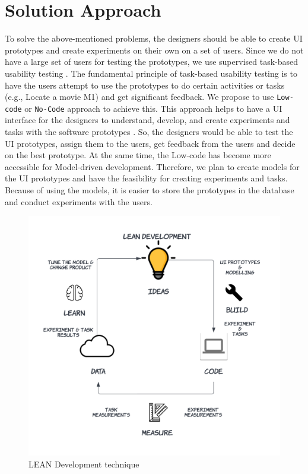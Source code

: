 \section{Solution Approach}
\label{intro:section:solution}
To solve the above-mentioned problems, the designers should be able to create UI prototypes and create experiments on their own on a set of users.
Since we do not have a large set of users for testing the prototypes, we use supervised task-based usability testing \cite{article:dataanalysis:supervisedtest}.
The fundamental principle of task-based usability testing is to have the users attempt to use the prototypes to do certain activities or tasks (e.g., Locate a movie M1) and get significant feedback.
We propose to use \texttt{Low-code} or \texttt{No-Code} approach to achieve this.
This approach helps to have a UI interface for the designers to understand, develop, and create experiments and tasks with the software prototypes \cite{paper:lowcode:khorram}.
So, the designers would be able to test the UI prototypes, assign them to the users, get feedback from the users and decide on the best prototype.
At the same time, the Low-code has become more accessible for Model-driven development.
Therefore, we plan to create models for the UI prototypes and have the feasibility for creating experiments and tasks. 
Because of using the models, it is easier to store the prototypes in the database and conduct experiments with the users. 

\begin{figure}[ht]
    \centering
    \includegraphics[scale=0.15]{images/solution-ideas/LEAN.png}
    \caption{LEAN Development technique}
    \label{intro:fig:lean}
\end{figure}

